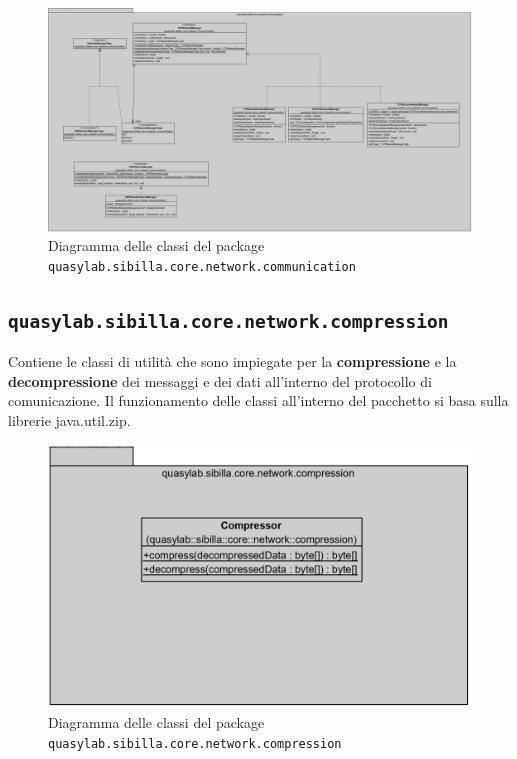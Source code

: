 \begin{figure}[H]
    \includegraphics[width=\linewidth]{images/quasylab.sibilla.core.network.communication.png}
    \captionsetup{justification=centering}
    \caption{Diagramma delle classi del package \texttt{quasylab.sibilla.core.network.communication}}
  \end{figure}

\subsection{\texttt{quasylab.sibilla.core.network.compression}} Contiene le classi di utilità che sono impiegate per la \textbf{compressione} e la \textbf{decompressione} dei messaggi e dei dati all’interno del protocollo di comunicazione. Il funzionamento delle classi all’interno del pacchetto si basa sulla librerie java.util.zip.

\begin{figure}[H]
    \includegraphics[width=\linewidth]{images/quasylab.sibilla.core.network.compression.png}
    \captionsetup{justification=centering}
    \caption{Diagramma delle classi del package \texttt{quasylab.sibilla.core.network.compression}}
  \end{figure}

